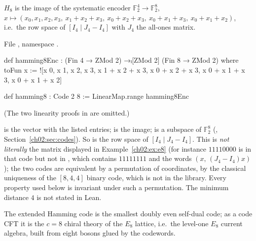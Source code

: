 \begin{definition}\label{ch02:def:hamming8}
$H_8$ is the image of the systematic encoder $\mathbb F_2^4\to\mathbb F_2^8$,
$x\mapsto(x_0,x_1,x_2,x_3,\ x_1+x_2+x_3,\ x_0+x_2+x_3,\ x_0+x_1+x_3,\ x_0+x_1+x_2)$, i.e.\ the row space of
$[I_4\mid J_4-I_4]$ with $J_4$ the all-ones matrix.
\end{definition}
\noindent File , namespace .
\begin{leancode}
def hamming8Enc : (Fin 4 → ZMod 2) →ₗ[ZMod 2] (Fin 8 → ZMod 2) where
  toFun x := ![x 0, x 1, x 2, x 3,
    x 1 + x 2 + x 3, x 0 + x 2 + x 3, x 0 + x 1 + x 3, x 0 + x 1 + x 2]

def hamming8 : Code 2 8 := LinearMap.range hamming8Enc
\end{leancode}
(The two linearity proofs in  are omitted.)
\begin{dictionary}
\lean{![a, b, …]} is the vector with the listed entries;  is the image;  is a subspace of
$\mathbb F_2^8$ (, Section~\ref{ch02:sec:codes}). So  is the row
space of $[I_4\mid J_4-I_4]$. This is \emph{not literally} the matrix displayed in Example~\ref{ch02:ex:e8} (for instance
$11110000$ is in that code but not in , which contains $11111111$ and the words $(x,\,(J_4-I_4)x)$); the two codes
are equivalent by a permutation of coordinates, by the classical uniqueness of the $[8,4,4]$ binary code, which is not in the
library. Every property used below is invariant under such a permutation. The minimum distance $4$ is not stated in Lean.
\end{dictionary}
\begin{physics}
The extended Hamming code is the smallest doubly even self-dual code; as a code CFT it is the $c=8$ chiral theory of the $E_8$
lattice, i.e.\ the level-one $E_8$ current algebra, built from eight bosons glued by the codewords.
\end{physics}

